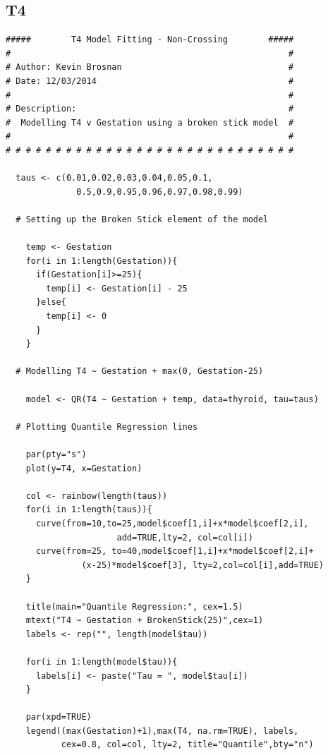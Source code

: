 \documentclass[12pt,a4paper]{report}
\begin{document}
\subsection*{T4}
\begin{lstlisting}
#####        T4 Model Fitting - Non-Crossing        #####
#                                                       #
# Author: Kevin Brosnan                                 #
# Date: 12/03/2014                                      #
#                                                       #
# Description:                                          #
#  Modelling T4 v Gestation using a broken stick model  #
#                                                       #
# # # # # # # # # # # # # # # # # # # # # # # # # # # # #

  taus <- c(0.01,0.02,0.03,0.04,0.05,0.1,
              0.5,0.9,0.95,0.96,0.97,0.98,0.99)

  # Setting up the Broken Stick element of the model

    temp <- Gestation
    for(i in 1:length(Gestation)){
      if(Gestation[i]>=25){
        temp[i] <- Gestation[i] - 25
      }else{
        temp[i] <- 0
      }
    }

  # Modelling T4 ~ Gestation + max(0, Gestation-25)

    model <- QR(T4 ~ Gestation + temp, data=thyroid, tau=taus)

  # Plotting Quantile Regression lines

    par(pty="s")
    plot(y=T4, x=Gestation)

    col <- rainbow(length(taus))
    for(i in 1:length(taus)){
      curve(from=10,to=25,model$coef[1,i]+x*model$coef[2,i],
                      add=TRUE,lty=2, col=col[i])
      curve(from=25, to=40,model$coef[1,i]+x*model$coef[2,i]+
               (x-25)*model$coef[3], lty=2,col=col[i],add=TRUE)
    }

    title(main="Quantile Regression:", cex=1.5)
    mtext("T4 ~ Gestation + BrokenStick(25)",cex=1)
    labels <- rep("", length(model$tau))

    for(i in 1:length(model$tau)){
      labels[i] <- paste("Tau = ", model$tau[i])
    }

    par(xpd=TRUE)
    legend((max(Gestation)+1),max(T4, na.rm=TRUE), labels,
           cex=0.8, col=col, lty=2, title="Quantile",bty="n")
\end{lstlisting}
\end{document}

